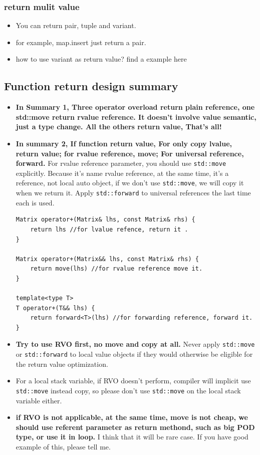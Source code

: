 \documentclass[a4paper,11pt,twoside]{book}
\begin{document}
\subsubsection{return mulit value}
\begin{itemize}
	\item You can return pair, tuple and variant. 
	\item for example, map.insert just return a pair. 
	\item how to use variant as return value? find a example here
\end{itemize}


\subsection{Function return design summary}

\begin{itemize}
		\item \textbf{In Summary 1, Three operator overload return plain reference, one std::move return rvalue reference. It doesn't involve value semantic, just a type change. All the others return value, That's all!}
	
		\item \textbf{In summary 2, If function return value, For only copy lvalue, return value; for rvalue reference, move;  For universal reference, forward. } For rvalue reference parameter, you should use \texttt{std::move} explicitly. Because it's name rvalue reference, at the same time, it's a reference, not local auto object, if we don't use \texttt{std::move}, we will copy it when we return it.  Apply \texttt{std::forward} to universal references the last time each is used.
	
\begin{lstlisting}[numbers=none]
Matrix operator+(Matrix& lhs, const Matrix& rhs) {
	return lhs //for lvalue refence, return it .
}
	
Matrix operator+(Matrix&& lhs, const Matrix& rhs) {
	return move(lhs) //for rvalue reference move it.
}
	
template<type T>
T operator+(T&& lhs) {
	return forward<T>(lhs) //for forwarding reference, forward it.
}
\end{lstlisting}

		\item \textbf{Try to use RVO first, no move and copy at all.} Never apply \texttt{std::move} or \texttt{std::forward} to local value objects if they would otherwise be eligible for the return value optimization.

		\item For a local stack variable, if RVO doesn't perform, compiler will implicit use \texttt{std::move} instead copy, so please don't use \texttt{std::move} on the local stack variable either.

		\item \textbf{if RVO is not applicable, at the same time, move is not cheap, we should use referent parameter as return methond, such as big POD type, or use it in loop.} I think that it will be rare case. If you have good example of this, please tell me. 

\end{itemize}
\end{document}
